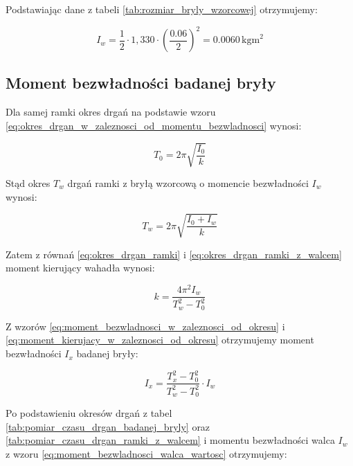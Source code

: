 \documentclass[a4paper,12pt]{article}
\begin{document}
Podstawiając dane z tabeli \ref{tab:rozmiar_bryly_wzorcowej} otrzymujemy:

\begin{equation} \label{eq:moment_bezwladnosci_walca_wartosc}
    I_w = \frac{1}{2} \cdot 1,330 \cdot \left(\frac{0.06}{2}\right)^2 = 0.0060\,\text{kgm}^2
\end{equation}


\subsection{Moment bezwładności badanej bryły}

Dla samej ramki okres drgań na podstawie wzoru \ref{eq:okres_drgan_w_zaleznosci_od_momentu_bezwladnosci} wynosi:

\begin{equation} \label{eq:okres_drgan_ramki}
    T_0 = 2\pi \sqrt{\frac{I_0}{k}}
\end{equation}

Stąd okres $T_w$ drgań ramki z bryłą wzorcową o momencie bezwładności $I_w$ wynosi:

\begin{equation} \label{eq:okres_drgan_ramki_z_walcem}
    T_w = 2\pi \sqrt{\frac{I_0 + I_w}{k}}
\end{equation}

Zatem z równań \eqref{eq:okres_drgan_ramki} i \eqref{eq:okres_drgan_ramki_z_walcem} moment kierujący wahadła wynosi:

\begin{equation} \label{eq:moment_kierujacy_w_zaleznosci_od_okresu}
    k = \frac{4\pi^2 I_w}{T_w^2 - T_0^2}
\end{equation}

Z wzorów \eqref{eq:moment_bezwladnosci_w_zaleznosci_od_okresu} i \eqref{eq:moment_kierujacy_w_zaleznosci_od_okresu} otrzymujemy moment bezwładności $I_x$ badanej bryły:

\begin{equation} \label{eq:moment_bezwladnosci_badanej_bryly}
    I_x = \frac{T_x^2 - T_0^2}{T_w^2 - T_0^2} \cdot I_w
\end{equation}

Po podstawieniu okresów drgań z tabel \ref{tab:pomiar_czasu_drgan_badanej_bryly} oraz \ref{tab:pomiar_czasu_drgan_ramki_z_walcem} i momentu bezwładności walca $I_w$ z wzoru \eqref{eq:moment_bezwladnosci_walca_wartosc} otrzymujemy:
\end{document}
